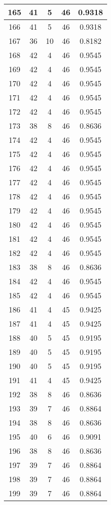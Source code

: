 \documentclass[letterpaper, 12pt]{article}
\begin{document}
\begin{longtable}{|c|c|c|c|c|}
\hline
165 & 41 & 5 & 46 & 0.9318 \\
\hline
166 & 41 & 5 & 46 & 0.9318 \\
\hline
167 & 36 & 10 & 46 & 0.8182 \\
\hline
168 & 42 & 4 & 46 & 0.9545 \\
\hline
169 & 42 & 4 & 46 & 0.9545 \\
\hline
170 & 42 & 4 & 46 & 0.9545 \\
\hline
171 & 42 & 4 & 46 & 0.9545 \\
\hline
172 & 42 & 4 & 46 & 0.9545 \\
\hline
173 & 38 & 8 & 46 & 0.8636 \\
\hline
174 & 42 & 4 & 46 & 0.9545 \\
\hline
175 & 42 & 4 & 46 & 0.9545 \\
\hline
176 & 42 & 4 & 46 & 0.9545 \\
\hline
177 & 42 & 4 & 46 & 0.9545 \\
\hline
178 & 42 & 4 & 46 & 0.9545 \\
\hline
179 & 42 & 4 & 46 & 0.9545 \\
\hline
180 & 42 & 4 & 46 & 0.9545 \\
\hline
181 & 42 & 4 & 46 & 0.9545 \\
\hline
182 & 42 & 4 & 46 & 0.9545 \\
\hline
183 & 38 & 8 & 46 & 0.8636 \\
\hline
184 & 42 & 4 & 46 & 0.9545 \\
\hline
185 & 42 & 4 & 46 & 0.9545 \\
\hline
186 & 41 & 4 & 45 & 0.9425 \\
\hline
187 & 41 & 4 & 45 & 0.9425 \\
\hline
188 & 40 & 5 & 45 & 0.9195 \\
\hline
189 & 40 & 5 & 45 & 0.9195 \\
\hline
190 & 40 & 5 & 45 & 0.9195 \\
\hline
191 & 41 & 4 & 45 & 0.9425 \\
\hline
192 & 38 & 8 & 46 & 0.8636 \\
\hline
193 & 39 & 7 & 46 & 0.8864 \\
\hline
194 & 38 & 8 & 46 & 0.8636 \\
\hline
195 & 40 & 6 & 46 & 0.9091 \\
\hline
196 & 38 & 8 & 46 & 0.8636 \\
\hline
197 & 39 & 7 & 46 & 0.8864 \\
\hline
198 & 39 & 7 & 46 & 0.8864 \\
\hline
199 & 39 & 7 & 46 & 0.8864 \\
\hline
\end{longtable}
\end{document}
